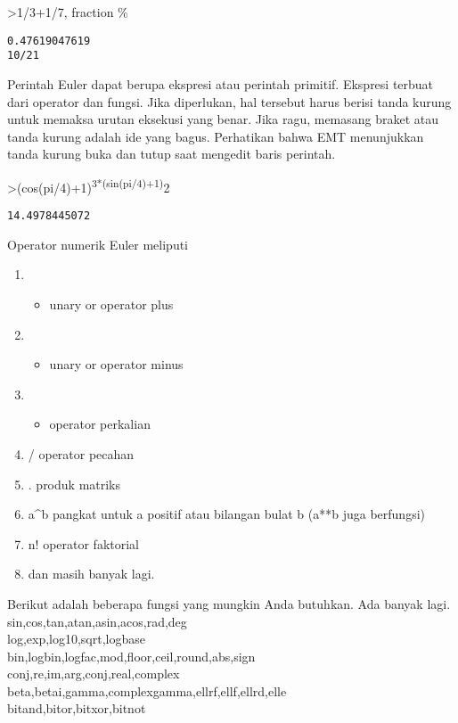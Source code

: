 \documentclass[
]{book}
\providecommand{\tightlist}{%
  \setlength{\itemsep}{0pt}\setlength{\parskip}{0pt}}
\begin{document}
\textgreater1/3+1/7, fraction \%

\begin{verbatim}
0.47619047619
10/21
\end{verbatim}

Perintah Euler dapat berupa ekspresi atau perintah primitif. Ekspresi terbuat dari operator dan fungsi. Jika diperlukan, hal tersebut harus berisi tanda kurung untuk memaksa urutan eksekusi yang benar. Jika ragu, memasang braket atau tanda kurung adalah ide yang bagus. Perhatikan bahwa EMT menunjukkan tanda kurung buka dan tutup saat mengedit baris perintah.

\textgreater(cos(pi/4)+1)\textsuperscript{3*(sin(pi/4)+1)}2

\begin{verbatim}
14.4978445072
\end{verbatim}

Operator numerik Euler meliputi

\begin{enumerate}
\def\labelenumi{\arabic{enumi}.}
\tightlist
\item
  \begin{itemize}
  \tightlist
  \item
    unary or operator plus\\
  \end{itemize}
\item
  \begin{itemize}
  \tightlist
  \item
    unary or operator minus
  \end{itemize}
\item
  \begin{itemize}
  \tightlist
  \item
    operator perkalian\\
  \end{itemize}
\item
  / operator pecahan\\
\item
  . produk matriks\\
\item
  a\^{}b pangkat untuk a positif atau bilangan bulat b (a**b juga berfungsi)
\item
  n! operator faktorial
\item
  dan masih banyak lagi.
\end{enumerate}

Berikut adalah beberapa fungsi yang mungkin Anda butuhkan. Ada banyak lagi. sin,cos,tan,atan,asin,acos,rad,deg\\
log,exp,log10,sqrt,logbase\\
bin,logbin,logfac,mod,floor,ceil,round,abs,sign\\
conj,re,im,arg,conj,real,complex\\
beta,betai,gamma,complexgamma,ellrf,ellf,ellrd,elle\\
bitand,bitor,bitxor,bitnot
\end{document}
